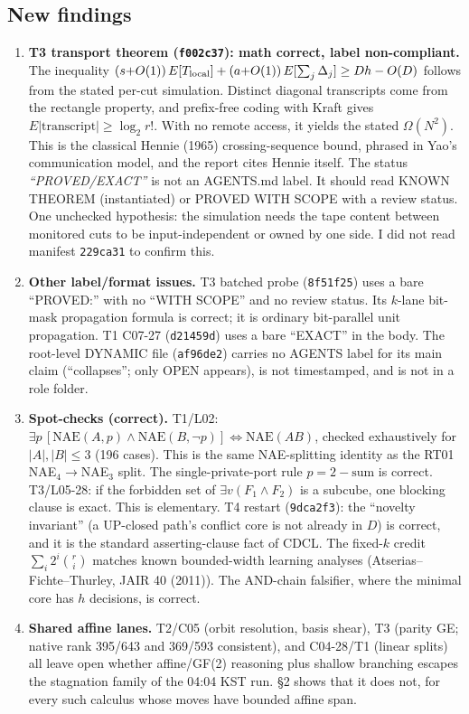 \documentclass[11pt]{article}
\theoremstyle{definition}
\begin{document}
\subsection*{New findings}
\begin{enumerate}
\item \textbf{T3 transport theorem (\texttt{f002c37}): math correct, label non-compliant.} The inequality $(s{+}O(1))\,E[T_{\rm local}]+(a{+}O(1))\,E[\sum_j\Delta_j]\ge Dh-O(D)$ follows from the stated per-cut simulation. Distinct diagonal transcripts come from the rectangle property, and prefix-free coding with Kraft gives $E|\text{transcript}|\ge\log_2 r!$. With no remote access, it yields the stated $\Omega(N^2)$. This is the classical Hennie (1965) crossing-sequence bound, phrased in Yao's communication model, and the report cites Hennie itself. The status \emph{``PROVED/EXACT''} is not an AGENTS.md label. It should read KNOWN THEOREM (instantiated) or PROVED WITH SCOPE with a review status. One unchecked hypothesis: the simulation needs the tape content between monitored cuts to be input-independent or owned by one side. I did not read manifest \texttt{229ca31} to confirm this.
\item \textbf{Other label/format issues.} T3 batched probe (\texttt{8f51f25}) uses a bare ``PROVED:'' with no ``WITH SCOPE'' and no review status. Its $k$-lane bit-mask propagation formula is correct; it is ordinary bit-parallel unit propagation. T1 C07-27 (\texttt{d21459d}) uses a bare ``EXACT'' in the body. The root-level DYNAMIC file (\texttt{af96de2}) carries no AGENTS label for its main claim (``collapses''; only OPEN appears), is not timestamped, and is not in a role folder.
\item \textbf{Spot-checks (correct).} T1/L02: $\exists p\,[\mathrm{NAE}(A,p)\wedge\mathrm{NAE}(B,\neg p)]\iff\mathrm{NAE}(AB)$, checked exhaustively for $|A|,|B|\le3$ (196 cases). This is the same NAE-splitting identity as the RT01 NAE$_4\to$NAE$_3$ split. The single-private-port rule $p=2-\text{sum}$ is correct. T3/L05-28: if the forbidden set of $\exists v(F_1\wedge F_2)$ is a subcube, one blocking clause is exact. This is elementary. T4 restart (\texttt{9dca2f3}): the ``novelty invariant'' (a UP-closed path's conflict core is not already in $D$) is correct, and it is the standard asserting-clause fact of CDCL. The fixed-$k$ credit $\sum_i2^i\binom ri$ matches known bounded-width learning analyses (Atserias--Fichte--Thurley, JAIR 40 (2011)). The AND-chain falsifier, where the minimal core has $h$ decisions, is correct.
\item \textbf{Shared affine lanes.} T2/C05 (orbit resolution, basis shear), T3 (parity GE; native rank 395/643 and 369/593 consistent), and C04-28/T1 (linear splits) all leave open whether affine/GF(2) reasoning plus shallow branching escapes the stagnation family of the 04:04 KST run. \S2 shows that it does not, for every such calculus whose moves have bounded affine span.
\end{enumerate}
\end{document}
